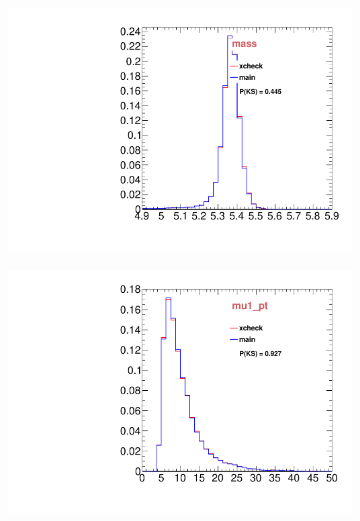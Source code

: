 \begin{figure}
\begin{subfigure}[b]{0.2\textwidth}
                \includegraphics[width=\textwidth]{Figures/VariablesComparison/MC_barrel_figs/m}
                \label{fig:MC_barrel_m}
        \end{subfigure}
        \begin{subfigure}[b]{0.2\textwidth}
                \centering
                \includegraphics[width=\textwidth]{Figures/VariablesComparison/MC_barrel_figs/m1pt}
                \label{fig:MC_barrel_m1pt}
        \end{subfigure}
        \begin{subfigure}[b]{0.2\textwidth}
                \centering

\end{subfigure}
\end{figure}
